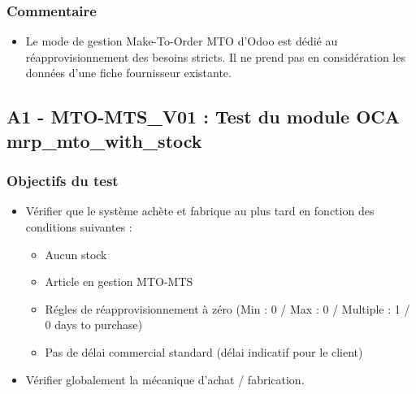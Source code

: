 \documentclass[letterpaper,10pt,french]{sphinxmanual}
\begin{document}
\subsubsection{Commentaire}
\label{\detokenize{readthedocs/tests/A1_MTO:commentaire}}\begin{itemize}
\item {} 
Le mode de gestion Make-To-Order MTO d’Odoo est dédié au réapprovisionnement des besoins stricts. Il ne prend pas en considération les données d’une fiche fournisseur existante.

\end{itemize}


\subsection{A1 - MTO-MTS\_V01 : Test du module OCA mrp\_mto\_with\_stock}
\label{\detokenize{readthedocs/tests/A1_MTO_MTS:a1-mto-mts-v01-test-du-module-oca-mrp-mto-with-stock}}\label{\detokenize{readthedocs/tests/A1_MTO_MTS::doc}}

\subsubsection{Objectifs du test}
\label{\detokenize{readthedocs/tests/A1_MTO_MTS:objectifs-du-test}}\begin{itemize}
\item {} 
Vérifier que le système achète et fabrique au plus tard en fonction des conditions suivantes :
\begin{itemize}
\item {} 
Aucun stock

\item {} 
Article en gestion MTO-MTS

\item {} 
Régles de réapprovisionnement à zéro (Min : 0 / Max : 0 / Multiple : 1 / 0 days to purchase)

\item {} 
Pas de délai commercial standard (délai indicatif pour le client)

\end{itemize}

\item {} 
Vérifier globalement la mécanique d’achat / fabrication.

\end{itemize}
\end{document}

